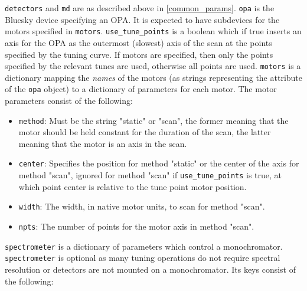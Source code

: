 \texttt{detectors} and \texttt{md} are as described above in \ref{common_params}.
\texttt{opa} is the Bluesky device specifying an OPA.
It is expected to have subdevices for the motors specified in \texttt{motors}.
\texttt{use\_tune\_points} is a boolean which if true inserts an axis for the OPA as the outermost (slowest) axis of the scan at the points specified by the tuning curve.
If motors are specified, then only the points specified by the relevant tunes are used, otherwise all points are used.
\texttt{motors} is a dictionary mapping the \textit{names} of the motors (as strings representing the attribute of the \texttt{opa} object) to a dictionary of parameters for each motor.
The motor parameters consist of the following:
\begin{itemize}
	\item \texttt{method}: Must be the string "static" or "scan", the former meaning that the motor should be held constant for the duration of the scan, the latter meaning that the motor is an axis in the scan.
	\item \texttt{center}: Specifies the position for method "static" or the center of the axis for method "scan", ignored for method "scan" if \texttt{use\_tune\_points} is true, at which point center is relative to the tune point motor position.
	\item \texttt{width}: The width, in native motor units, to scan for method "scan".
	\item \texttt{npts}: The number of points for the motor axis in method "scan".
\end{itemize}
\texttt{spectrometer} is a dictionary of parameters which control a monochromator.
\texttt{spectrometer} is optional as many tuning operations do not require spectral resolution or detectors are not mounted on a monochromator.
Its keys consist of the following:
